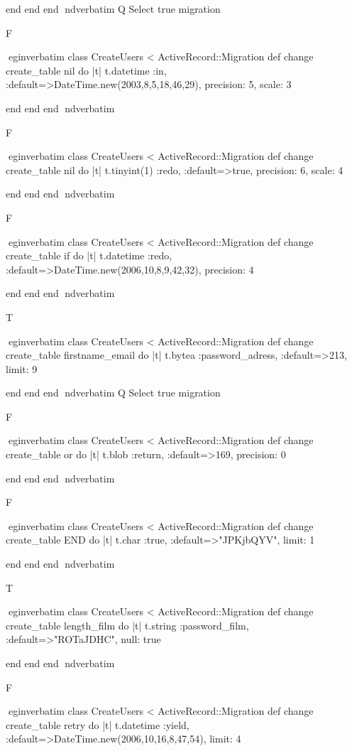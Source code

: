    end 
  end 
end
nd{verbatim}
Q
 Select true migration

F

egin{verbatim}
 class CreateUsers < ActiveRecord::Migration 
  def change 
    create_table nil do |t| 
      t.datetime :in, :default=>DateTime.new(2003,8,5,18,46,29), precision: 5, scale: 3
    
    end 
  end 
end
nd{verbatim}

F

egin{verbatim}
 class CreateUsers < ActiveRecord::Migration 
  def change 
    create_table nil do |t| 
      t.tinyint(1) :redo, :default=>true, precision: 6, scale: 4
    
    end 
  end 
end
nd{verbatim}

F

egin{verbatim}
 class CreateUsers < ActiveRecord::Migration 
  def change 
    create_table if do |t| 
      t.datetime :redo, :default=>DateTime.new(2006,10,8,9,42,32), precision: 4
    
    end 
  end 
end
nd{verbatim}

T

egin{verbatim}
 class CreateUsers < ActiveRecord::Migration 
  def change 
    create_table firstname_email do |t| 
      t.bytea :password_adress, :default=>213, limit: 9
    
    end 
  end 
end
nd{verbatim}
Q
 Select true migration

F

egin{verbatim}
 class CreateUsers < ActiveRecord::Migration 
  def change 
    create_table or do |t| 
      t.blob :return, :default=>169, precision: 0
    
    end 
  end 
end
nd{verbatim}

F

egin{verbatim}
 class CreateUsers < ActiveRecord::Migration 
  def change 
    create_table END do |t| 
      t.char :true, :default=>"JPKjbQYV", limit: 1
    
    end 
  end 
end
nd{verbatim}

T

egin{verbatim}
 class CreateUsers < ActiveRecord::Migration 
  def change 
    create_table length_film do |t| 
      t.string :password_film, :default=>"ROTaJDHC", null: true
    
    end 
  end 
end
nd{verbatim}

F

egin{verbatim}
 class CreateUsers < ActiveRecord::Migration 
  def change 
    create_table retry do |t| 
      t.datetime :yield, :default=>DateTime.new(2006,10,16,8,47,54), limit: 4
    
